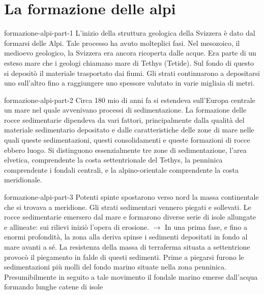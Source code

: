 \documentclass[preview]{standalone}
\begin{document}
\genpage

\section{La formazione delle alpi}

\begin{snippet}{formazione-alpi-part-1}
    L'inizio della struttura geologica della Svizzera è dato dal formarsi delle Alpi. Tale processo ha avuto
    molteplici fasi. Nel mesozoico, il medioevo geologico, la Svizzera era ancora ricoperta dalle acque.
    Era parte di un esteso mare che i geologi chiamano mare di Tethys (Tetide). Sul fondo di questo si
    depositò il materiale trasportato dai fiumi. Gli strati continuarono a depositarsi uno sull'altro fino a
    raggiungere uno spessore valutato in varie migliaia di metri.
\end{snippet}


\begin{snippet}{formazione-alpi-part-2}
    Circa 180 mio di anni fa si estendeva sull’Europa centrale un mare nel quale avvenivano
    processi di sedimentazione.
    La formazione delle rocce sedimentarie dipendeva da vari fattori, principalmente dalla qualità del
    materiale sedimentario depositato e dalle caratteristiche delle zone di mare nelle quali queste
    sedimentazioni, questi consolidamenti e queste formazioni di rocce ebbero luogo. Si distinguono
    essenzialmente tre zone di sedimentazione, l'area elvetica, comprendente la costa settentrionale
    del Tethys, la penninica comprendente i fondali centrali, e la alpino-orientale comprendente la
    costa meridionale.
\end{snippet}


\begin{snippet}{formazione-alpi-part-3}
    Potenti spinte spostarono verso nord la massa continentale che si trovava a meridione. Gli
    strati sedimentari vennero piegati e sollevati. Le rocce sedimentarie emersero dal mare e
    formarono diverse serie di isole allungate e allineate: sui rilievi iniziò l'opera di erosione. \(\rightarrow\) In una
    prima fase, e fino a enormi profondità, la zona alla deriva spinse i sedimenti depositati in fondo al
    mare avanti a sé. La resistenza della massa di terraferma situata a settentrione provocò il
    piegamento in falde di questi sedimenti. Prime a piegarsi furono le sedimentazioni più molli del
    fondo marino situate nella zona penninica. Presumibilmente in seguito a tale movimento il fondale
    marino emerse dall'acqua formando lunghe catene di isole
\end{snippet}
\end{document}
